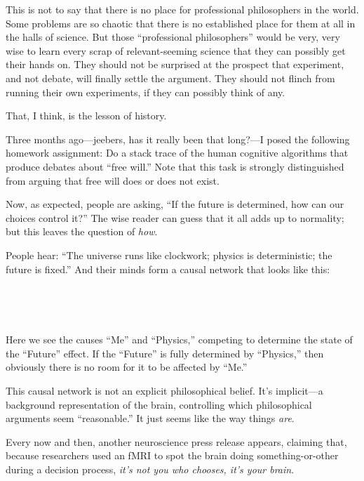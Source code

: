 {
 This is not to say that there is no place for professional
philosophers in the world. Some problems are so chaotic that there is
no established place for them at all in the halls of science. But those
``professional philosophers'' would
be very, very wise to learn every scrap of relevant-seeming science
that they can possibly get their hands on. They should not be surprised
at the prospect that experiment, and not debate, will finally settle
the argument. They should not flinch from running their own
experiments, if they can possibly think of any.}

{
 That, I think, is the lesson of history.}

\myendsectiontext


{
 Three months ago---jeebers, has it really been that long?---I
posed the following homework assignment: Do a stack trace of the human
cognitive algorithms that produce debates about ``free
will.'' Note that this task is strongly distinguished
from arguing that free will does or does not exist. }

{
 Now, as expected, people are asking, ``If the
future is determined, how can our choices control
it?'' The wise reader can guess that it all adds up
to normality; but this leaves the question of \textit{how}.}

{
 People hear: ``The universe runs like clockwork;
physics is deterministic; the future is fixed.'' And
their minds form a causal network that looks like this:}

{
 ~}

{\centering
{}
 
\par}


\bigskip

{
 ~}

{
 Here we see the causes ``Me''
and ``Physics,'' competing to
determine the state of the
``Future'' effect. If the
``Future'' is fully determined by
``Physics,'' then obviously there is
no room for it to be affected by
``Me.''}

{
 This causal network is not an explicit philosophical belief.
It's implicit---a background representation of the
brain, controlling which philosophical arguments seem
``reasonable.'' It just seems like
the way things \textit{are}.}

{
 Every now and then, another neuroscience press release appears,
claiming that, because researchers used an fMRI to spot the brain doing
something-or-other during a decision process,
\textit{it's not you who chooses, it's
your brain}.}

